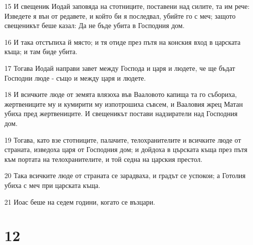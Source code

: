 \par 15 И свещеник Иодай заповяда на стотниците, поставени над силите, та им рече: Изведете я вън от редавете, и който би я последвал, убийте го с меч; защото свещеникът беше казал: Да не бъде убита в Господния дом.
\par 16 И така отстъпиха й място; и тя отиде през пътя на конския вход в царската къща; и там биде убита.
\par 17 Тогава Иодай направи завет между Господа и царя и людете, че ще бъдат Господни люде - също и между царя и людете.
\par 18 И всичките люде от земята влязоха във Вааловото капища та го събориха, жертвениците му и кумирити му изпотрошиха съвсем, и Вааловия жрец Матан убиха пред жертвениците. И свещеникът постави надзиратели над Господния дом.
\par 19 Тогава, като взе стотниците, палачите, телохранителите и всичките люде от страната, изведоха царя от Господния дом; и дойдоха в църската къща през пътя към портата на телохранителите, и той седна на царския престол.
\par 20 Така всичките люде от страната се зарадваха, и градът се успокои; а Готолия убиха с меч при царската къща.
\par 21 Иоас беше на седем години, когато се възцари.

\chapter{12}

